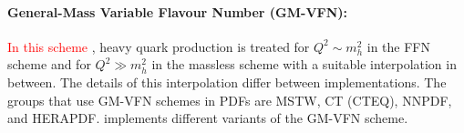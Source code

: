 \paragraph{General-Mass Variable Flavour Number (GM-VFN)\rm:\\}
\textcolor{red}{In this scheme \cite{Thorne:2008xf} }, heavy quark production is treated for
$Q^2 \sim m_h^2$ in the FFN scheme and for $Q^2 \gg m_h^2$
in the massless scheme with a suitable interpolation in between. 
The details of this interpolation differ between implementations.
The groups that use GM-VFN schemes in PDFs are MSTW, CT (CTEQ), NNPDF, and HERAPDF.
\fitter implements different variants of the GM-VFN scheme.
% 
